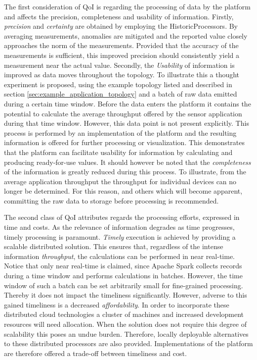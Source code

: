 The first consideration of QoI is regarding the processing of data by the platform and affects the precision, completeness and usability of information. Firstly, \emph{precision} and \emph{certainty} are obtained by employing the HistoricProcessors. By averaging measurements, anomalies are mitigated and the reported value closely approaches the norm of the measurements. Provided that the accuracy of the measurements is sufficient, this improved precision should consistently yield a measurement near the actual value. Secondly, the \emph{Usability} of information is improved as data moves throughout the topology. To illustrate this a thought experiment is proposed, using the example topology listed and described in section \ref{sec:example_application_topology} and a batch of raw data emitted during a certain time window. Before the data enters the platform it contains the potential to calculate the average throughput offered by the sensor application during that time window. However, this data point is not present explicitly. This process is performed by an implementation of the platform and the resulting information is offered for further processing or visualization. This demonstrates that the platform can facilitate usability for information by calculating and producing ready-for-use values. It should however be noted that the \emph{completeness} of the information is greatly reduced during this process. To illustrate, from the average application throughput the throughput for individual devices can no longer be determined. For this reason, and others which will become apparent, committing the raw data to storage before processing is recommended.

The second class of QoI attributes regards the processing efforts, expressed in time and costs. As the relevance of information degrades as time progresses, timely processing is paramount. \emph{Timely} execution is achieved by providing a scalable distributed solution. This ensures that, regardless of the intense information \emph{throughput}, the calculations can be performed in near real-time. Notice that only near real-time is claimed, since Apache Spark collects records during a time window and performs calculations in batches. However, the time window of such a batch can be set arbitrarily small for fine-grained processing. Thereby it does not impact the timeliness significantly. However, adverse to this gained timeliness is a decreased \emph{affordability}. In order to incorporate these distributed cloud technologies a cluster of machines and increased development resources will need allocation. When the solution does not require this degree of scalability this poses an undue burden. Therefore, locally deployable alternatives to these distributed processors are also provided. Implementations of the platform are therefore offered a trade-off between timeliness and cost.
	
